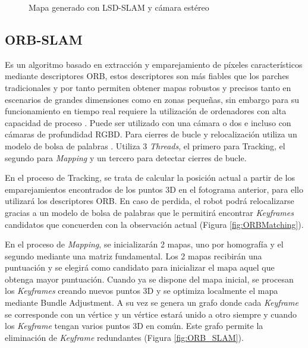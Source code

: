 \begin{figure}[H]
\begin{center}
\end{center}
\caption{Mapa generado con LSD-SLAM y cámara estéreo}
\end{figure}

\clearpage

\subsection{ORB-SLAM}
Es un algoritmo basado en extracción y emparejamiento de píxeles característicos mediante descriptores ORB, estos descriptores son más fiables que los parches tradicionales y por tanto permiten obtener mapas robustos y precisos tanto en escenarios de grandes dimensiones como en zonas pequeñas, sin embargo para su funcionamiento en tiempo real requiere la utilización de ordenadores con alta capacidad de proceso \cite{Mur2015orb}.
Puede ser utilizado con una cámara o dos e incluso con cámaras de profundidad RGBD. Para cierres de bucle y relocalización utiliza un modelo de bolsa de palabras \cite{galvez2012bags}.
Utiliza 3 \textit{Threads}, el primero para Tracking, el segundo para \textit{Mapping} y un tercero para detectar cierres de bucle. 

En el proceso de Tracking, se trata de calcular la posición actual a partir de los emparejamientos encontrados de los puntos 3D en el fotograma anterior, para ello utilizará los descriptores ORB.
En caso de perdida, el robot podrá relocalizarse gracias a un modelo de bolsa de palabras que le permitirá encontrar \textit{Keyframes} candidatos que concuerden con la observación actual (Figura \ref{fig:ORBMatching}).

En el proceso de \textit{Mapping}, se inicializarán 2 mapas, uno por homografía y el segundo mediante una matriz fundamental. Los 2 mapas recibirán una puntuación y se elegirá como candidato para inicializar el mapa aquel que obtenga mayor puntuación. Cuando ya se dispone del mapa inicial, se procesan los \textit{Keyframes} creando nuevos puntos 3D y se optimiza localmente el mapa mediante Bundle Adjustment. A su vez se genera un grafo donde cada \textit{Keyframe} se corresponde con un vértice y un vértice estará unido a otro siempre y cuando los \textit{Keyframe} tengan varios puntos 3D en común. Este grafo permite la eliminación de \textit{Keyframe} redundantes (Figura \ref{fig:ORB_SLAM}).

